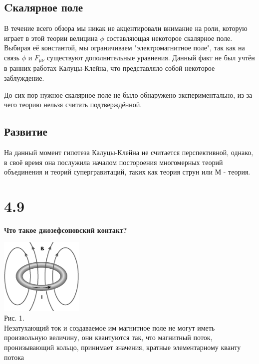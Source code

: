 \documentclass[a4paper,14pt]{article}
\begin{document}
\subsection*{Cкалярное поле}

	В течение всего обзора мы никак не акцентировали внимание на роли, которую играет в этой теории велицина $ \phi $ составляющая некоторое скалярное поле. Выбирая её константой, мы ограничиваем "электромагнитное поле", так как на связь $ \phi $ и $ F_{\mu \nu} $ существуют дополнительные уравнения. Данный факт не был учтён в ранних работах Калуцы-Клейна, что представляло собой некоторое заблуждение. 

	До сих пор нужное скалярное поле не было обнаружено экспериментально, из-за чего теорию нельзя считать подтверждённой.

\subsection*{Развитие}

	На данный момент гипотеза Калуцы-Клейна не считается перспективной, однако, в своё время она послужила началом постороения многомерных теорий объединения и теорий супергравитаций, таких как теория струн или М - теория.


\section*{4.9}

\begin{center}
	\LARGE{\textbf{Что такое джозефсоновский контакт?}}\\
\end{center}

\begin{center}
	\includegraphics[width=0.3\textwidth]{4_9_0}\\
	Рис. 1.\\
	Незатухающий ток и создаваемое им магнитное поле не могут иметь произвольную величину, они квантуются так, что магнитный поток, пронизывающий кольцо, принимает значения, кратные элементарному кванту потока
\end{center}
\end{document}
